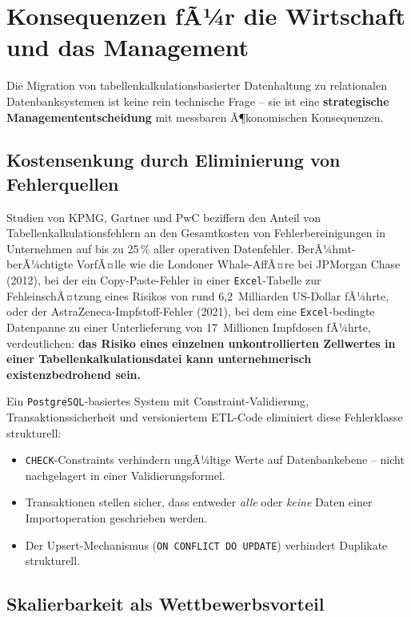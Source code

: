 ﻿\documentclass[12pt,a4paper]{report}
\theoremstyle{definition}
\theoremstyle{remark}
\newcommand{\excel}{\texttt{Excel}}
\newcommand{\pg}{\texttt{PostgreSQL}}
\newcommand{\code}[1]{\texttt{#1}}
\begin{document}
\section{Konsequenzen fÃ¼r die Wirtschaft und das Management}

Die Migration von tabellenkalkulationsbasierter Datenhaltung zu
relationalen Datenbanksystemen ist keine rein technische Frage --
sie ist eine \textbf{strategische Managemententscheidung} mit
messbaren Ã¶konomischen Konsequenzen.

\subsection{Kostensenkung durch Eliminierung von Fehlerquellen}

Studien von KPMG, Gartner und PwC beziffern den Anteil von
Tabellenkalkulationsfehlern an den Gesamtkosten von Fehlerbereinigungen
in Unternehmen auf bis zu 25\,\% aller operativen Datenfehler.
BerÃ¼hmt-berÃ¼chtigte VorfÃ¤lle wie die Londoner Whale-AffÃ¤re bei
JPMorgan Chase (2012), bei der ein Copy-Paste-Fehler in einer
\excel-Tabelle zur FehleinschÃ¤tzung eines Risikos von rund
6{,}2~Milliarden US-Dollar fÃ¼hrte, oder der AstraZeneca-Impfstoff-Fehler
(2021), bei dem eine \excel-bedingte Datenpanne zu einer Unterlieferung
von 17~Millionen Impfdosen fÃ¼hrte, verdeutlichen: \textbf{das Risiko
eines einzelnen unkontrollierten Zellwertes in einer
Tabellenkalkulationsdatei kann unternehmerisch existenzbedrohend sein.}

Ein \pg-basiertes System mit Constraint-Validierung,
Transaktionssicherheit und versioniertem ETL-Code eliminiert diese
Fehlerklasse strukturell:
\begin{itemize}[leftmargin=1.5em, itemsep=2pt]
  \item \code{CHECK}-Constraints verhindern ungÃ¼ltige Werte auf
        Datenbankebene -- nicht nachgelagert in einer Validierungsformel.
  \item Transaktionen stellen sicher, dass entweder \emph{alle} oder
        \emph{keine} Daten einer Importoperation geschrieben werden.
  \item Der Upsert-Mechanismus (\code{ON CONFLICT DO UPDATE}) verhindert
        Duplikate strukturell.
\end{itemize}

\subsection{Skalierbarkeit als Wettbewerbsvorteil}
\end{document}
